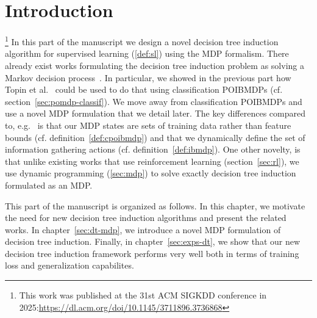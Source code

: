 \chapter{Introduction}\label{sec:part2}\footnote{This work was published at the 31st ACM SIGKDD conference in 2025:\url{https://dl.acm.org/doi/10.1145/3711896.3736868}}
In this part of the manuscript we design a novel decision tree induction algorithm for supervised learning (\ref{def:sl}) using the MDP formalism.
There already exist works formulating the decision tree induction problem as solving a Markov decision process~\cite{Dulac_Arnold_2011,garlapati2015reinforcementlearningapproachonline,topin2021iterative,chaouki2024branchesfastdynamicprogramming}.
In particular, we showed in the previous part how Topin et al.~\cite{topin2021iterative} could be used to do that using classification POIBMDPs (cf. section~\ref{sec:pomdp-classif}).
We move away from classification POIBMDPs and use a novel MDP formulation that we detail later.
The key differences compared to, e.g.~\cite{topin2021iterative} is that our MDP states are sets of training data rather than feature bounds (cf. definition~\ref{def:cpoibmdp}) and that we dynamically define the set of information gathering actions (cf. definition~\ref{def:ibmdp}).
One other novelty, is that unlike existing works that use reinforcement learning (section~\ref{sec:rl}), we use dynamic programming (\ref{sec:mdp}) to solve exactly decision tree induction formulated as an MDP.

This part of the manuscript is organized as follows.
In this chapter, we motivate the need for new decision tree induction algorithms and present the related works.
In chapter~\ref{sec:dt-mdp}, we introduce a novel MDP formulation of decision tree induction.
Finally, in chapter~\ref{sec:exps-dt}, we show that our new decision tree induction framework performs very well both in terms of training loss and generalization capabilites.


